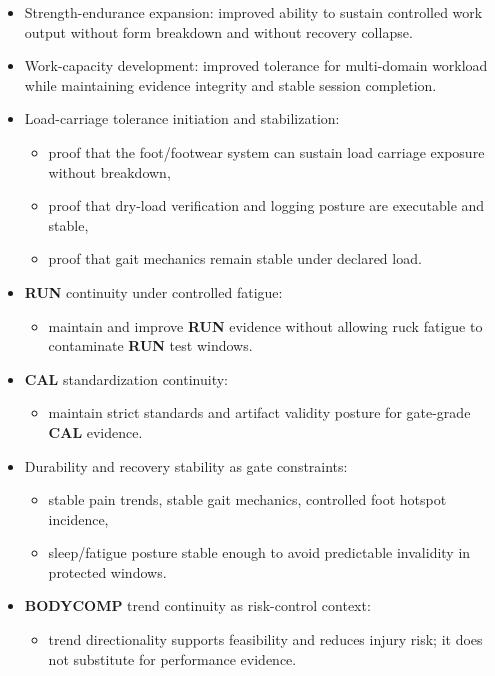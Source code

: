 \documentclass[10pt]{article}
\begin{document}
\begin{itemize}
\item Strength-endurance expansion: improved ability to sustain controlled work output without form breakdown and without recovery collapse.
\item Work-capacity development: improved tolerance for multi-domain workload while maintaining evidence integrity and stable session completion.
\item Load-carriage tolerance initiation and stabilization:
  \begin{itemize}
  \item proof that the foot/footwear system can sustain load carriage exposure without breakdown,
  \item proof that dry-load verification and logging posture are executable and stable,
  \item proof that gait mechanics remain stable under declared load.
  \end{itemize}
\item \textbf{RUN} continuity under controlled fatigue:
  \begin{itemize}
  \item maintain and improve \textbf{RUN} evidence without allowing ruck fatigue to contaminate \textbf{RUN} test windows.
  \end{itemize}
\item \textbf{CAL} standardization continuity:
  \begin{itemize}
  \item maintain strict standards and artifact validity posture for gate-grade \textbf{CAL} evidence.
  \end{itemize}
\item Durability and recovery stability as gate constraints:
  \begin{itemize}
  \item stable pain trends, stable gait mechanics, controlled foot hotspot incidence,
  \item sleep/fatigue posture stable enough to avoid predictable invalidity in protected windows.
  \end{itemize}
\item \textbf{BODYCOMP} trend continuity as risk-control context:
  \begin{itemize}
  \item trend directionality supports feasibility and reduces injury risk; it does not substitute for performance evidence.
  \end{itemize}
\end{itemize}
\end{document}
